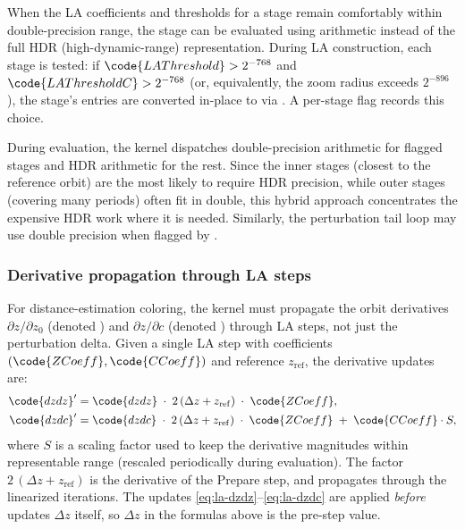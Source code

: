 When the LA coefficients and thresholds for a stage remain comfortably
within double-precision range, the stage can be evaluated using
 arithmetic instead of the full HDR (high-dynamic-range)
representation.  During LA construction, each stage is tested: if
\(\code{LAThreshold} > 2^{-768}\) and
\(\code{LAThresholdC} > 2^{-768}\) (or, equivalently, the zoom radius
exceeds \(2^{-896}\)), the stage's  entries are
converted in-place to  via
.  A per-stage flag
 records this choice.

During evaluation, the kernel dispatches double-precision arithmetic for
flagged stages and HDR arithmetic for the rest.  Since the inner stages
(closest to the reference orbit) are the most likely to require HDR
precision, while outer stages (covering many periods) often fit in
double, this hybrid approach concentrates the expensive HDR work where
it is needed.  Similarly, the perturbation tail loop may use
double precision when flagged by .

\subsubsection{Derivative propagation through LA steps}
\label{sec:la-derivatives}

For distance-estimation coloring, the kernel must propagate the orbit
derivatives \(\partial z / \partial z_0\) (denoted ) and
\(\partial z / \partial c\) (denoted ) through LA steps, not
just the perturbation delta.  Given a single LA step with coefficients
\((\code{ZCoeff}, \code{CCoeff})\) and reference \(z_\mathrm{ref}\), the
derivative updates are:
\begin{align}
\code{dzdz}' &= \code{dzdz}
  \;\cdot\; 2\,(\Delta z + z_\mathrm{ref})
  \;\cdot\; \code{ZCoeff},
\label{eq:la-dzdz}
\\
\code{dzdc}' &= \code{dzdc}
  \;\cdot\; 2\,(\Delta z + z_\mathrm{ref})
  \;\cdot\; \code{ZCoeff}
  \;+\; \code{CCoeff} \cdot S,
\label{eq:la-dzdc}
\end{align}
where \(S\) is a scaling factor used to keep the derivative magnitudes
within representable range (rescaled periodically during evaluation).
The factor \(2\,(\Delta z + z_\mathrm{ref})\) is the derivative of the
Prepare step, and  propagates through the linearized
iterations.  The updates \eqref{eq:la-dzdz}--\eqref{eq:la-dzdc} are applied \emph{before}
 updates \(\Delta z\) itself, so \(\Delta z\) in the
formulas above is the pre-step value.

